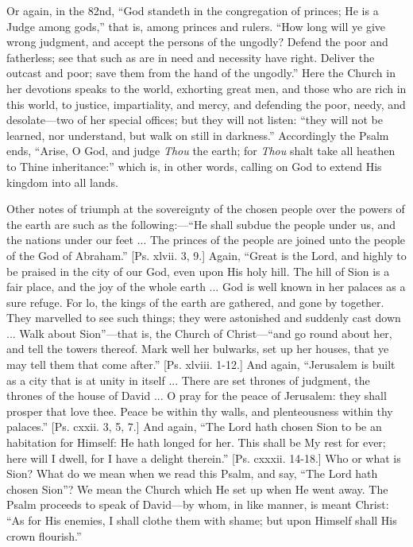 Or again, in the 82nd, ``God standeth in the congregation of
princes; He is a Judge among gods,'' that is, among princes and
rulers. ``How long will ye give wrong judgment, and accept the
persons of the ungodly? Defend the poor and fatherless; see that such
as are in need and necessity have right. Deliver the outcast and poor;
save them from the hand of the ungodly.'' Here the Church in her
devotions speaks to the world, exhorting great men, and those who are
rich in this world, to justice, impartiality, and mercy, and defending
the poor, needy, and desolate—two of her special offices; but they
will not listen: ``they will not be learned, nor understand, but
walk on still in darkness.'' Accordingly the Psalm ends,
``Arise, O God, and judge \emph{Thou} the earth; for \emph{Thou}
shalt take all heathen to Thine inheritance:'' which is, in other
words, calling on God to extend His kingdom into all lands.

Other notes of triumph at the sovereignty of the chosen people over
the powers of the earth are such as the following:—``He shall
subdue the people under us, and the nations under our feet ... The
princes of the people are joined unto the people of the God of
Abraham.'' [Ps. xlvii. 3, 9.] Again, ``Great is the Lord, and
highly to be praised in the city of our God, even upon His holy hill.
The hill of Sion is a fair place, and the joy of the whole earth ...
God is well known in her palaces as a sure refuge. For lo, the kings
of the earth are gathered, and gone by together. They marvelled to see
such things; they were astonished and suddenly cast down ... Walk
about Sion''—that is, the Church of Christ—``and go round
about her, and tell the towers thereof. Mark well her bulwarks, set up
her houses, that ye may tell them that come after.'' [Ps. xlviii.
1-12.] And again, ``Jerusalem is built as a city that is at unity
in itself ... There are set thrones of judgment, the thrones of the
house of David ... O pray for the peace of Jerusalem: they shall
prosper that love thee. Peace be within thy walls, and plenteousness
within thy palaces.'' [Ps. cxxii. 3, 5, 7.] And again, ``The
Lord hath chosen Sion to be an habitation for Himself: He hath longed
for her. This shall be My rest for ever; here will I dwell, for I have
a delight therein.'' [Ps. cxxxii. 14-18.] Who or what is Sion?
What do we mean when we read this Psalm, and say, ``The Lord hath
chosen Sion''? We mean the Church which He set up when He went
away. The Psalm proceeds to speak of David—by whom, in like manner,
is meant Christ: ``As for His enemies, I shall clothe them with
shame; but upon Himself shall His crown flourish.''

